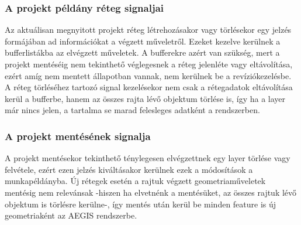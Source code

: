 \subsubsection{A projekt példány réteg signaljai}
Az aktuálisan megnyitott projekt réteg létrehozásakor vagy törlésekor egy jelzés formájában ad információkat a végzett műveletről. Ezeket kezelve kerülnek a bufferlistákba az elvégzett műveletek. A bufferekre azért van szükség, mert a projekt mentéséig nem tekinthető véglegesnek a réteg jelenléte vagy eltávolítása, ezért amíg nem mentett állapotban vannak, nem kerülnek be a revíziókezelésbe. A réteg törléséhez tartozó signal kezelésekor nem csak a rétegadatok eltávolítása kerül a bufferbe, hanem az összes rajta lévő objektum törlése is, így ha a layer már nincs jelen, a tartalma se marad felesleges adatként a rendszerben.
\subsubsection{A projekt mentésének signalja}
A projekt mentésekor tekinthető ténylegesen elvégzettnek egy layer törlése vagy felvétele, ezért ezen jelzés kiváltásakor kerülnek ezek a módosítások a munkapéldányba. Új rétegek esetén a rajtuk végzett geometriaműveletek mentésig nem relevánsak -hiszen ha elvetnénk a mentésüket, az összes rajtuk lévő objektum is törlésre kerülne-, így mentés után kerül be minden feature is új geometriaként az AEGIS rendszerbe.
